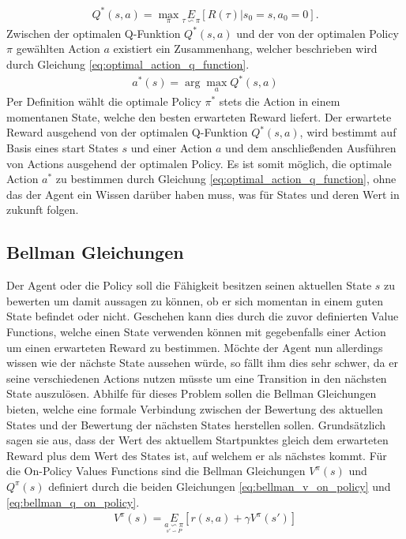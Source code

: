 \documentclass[]{iat}
\begin{document}
\begin{align}
    Q^{*}(s,a) = \underset{\pi}{\max}\underset{\tau \backsim \pi}{E}\left[R(\tau)|s_0 = s, a_0=0\right]. \label{eq:optimal_action_value_function}
\end{align}
Zwischen der optimalen Q-Funktion $Q^*(s,a)$ und der von der optimalen Policy $\pi$ gewählten Action $a$ existiert ein Zusammenhang, welcher beschrieben wird durch Gleichung \ref{eq:optimal_action_q_function}.
\begin{align}
    a^*(s) = \arg \max_a Q^* (s,a) \label{eq:optimal_action_q_function}
\end{align}
Per Definition wählt die optimale Policy $\pi^*$ stets die Action in einem momentanen State, welche den besten erwarteten Reward liefert. Der erwartete Reward ausgehend von der optimalen Q-Funktion $Q^*(s,a)$, wird bestimmt auf Basis eines start States $s$ und einer Action $a$ und dem anschließenden Ausführen von Actions ausgehend der optimalen Policy. Es ist somit möglich, die optimale Action $a^*$ zu bestimmen durch Gleichung \ref{eq:optimal_action_q_function}, ohne das der Agent ein Wissen darüber haben muss, was für States und deren Wert in zukunft folgen.

\subsection{Bellman Gleichungen}
Der Agent oder die Policy soll die Fähigkeit besitzen seinen aktuellen State $s$ zu bewerten um damit aussagen zu können, ob er sich momentan in einem guten State befindet oder nicht. Geschehen kann dies durch die zuvor definierten Value Functions, welche einen State verwenden können mit gegebenfalls einer Action um einen erwarteten Reward zu bestimmen. Möchte der Agent nun allerdings wissen wie der nächste State aussehen würde, so fällt ihm dies sehr schwer, da er seine verschiedenen Actions nutzen müsste um eine Transition in den nächsten State auszulösen. Abhilfe für dieses Problem sollen die Bellman Gleichungen bieten, welche eine formale Verbindung zwischen der Bewertung des aktuellen States und der Bewertung der nächsten States herstellen sollen. Grundsätzlich sagen sie aus, dass der Wert des aktuellem Startpunktes gleich dem erwarteten Reward plus dem Wert des States ist, auf welchem er als nächstes kommt. Für die On-Policy Values Functions sind die Bellman Gleichungen $V^{\pi}(s)$ und $Q^{\pi}(s)$ definiert durch die beiden Gleichungen \ref{eq:bellman_v_on_policy} und \ref{eq:bellman_q_on_policy}.
\begin{align}
    V^{\pi}(s) = \underset{\underset{s' \backsim P}{a \backsim \pi}}{E}\left[r(s,a)+\gamma V^{\pi}(s')\right] \label{eq:bellman_v_on_policy}
\end{align}
\end{document}
